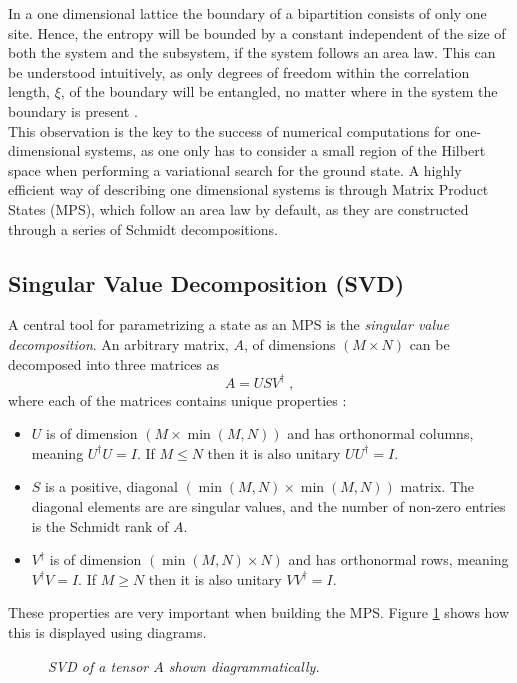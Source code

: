 In a one dimensional lattice the boundary of a bipartition consists of only one site. Hence, the entropy will be bounded by a constant independent of the size of both the system and the subsystem, if the system follows an area law. This can be understood intuitively, as only degrees of freedom within the correlation length, $\xi$, of the boundary will be entangled, no matter where in the system the boundary is present \cite{Hastings2007}.\\
This observation is the key to the success of numerical computations for one-dimensional systems, as one only has to consider a small region of the Hilbert space when performing a variational search for the ground state. A highly efficient way of describing one dimensional systems is through Matrix Product States (MPS), which follow an area law by default, as they are constructed through a series of Schmidt decompositions.


\subsection{Singular Value Decomposition (SVD)}
A central tool for parametrizing a state as an MPS is the \textit{singular value decomposition}. An arbitrary matrix, $A$, of dimensions $(M \times N)$ can be decomposed into three matrices as
\begin{equation}
	A = U S V^{\dag} \; ,
\end{equation}
where each of the matrices contains unique properties \cite{Schollwock}:
\begin{itemize}
	\item
		$U$ is of dimension $(M \times \min(M,N))$ and has orthonormal columns, meaning 			$U^{\dag}U = I$. If $M \leq N$ then it is also unitary $U U^{\dag} = I$.
	\item
		$S$ is a positive, diagonal $(\min(M,N) \times \min(M,N))$ matrix. The diagonal 			elements are are singular values, and the number of non-zero entries is the 				Schmidt rank of $A$.
	\item
		 $V^{\dag}$ is of dimension $(\min(M,N) \times N)$ and has orthonormal rows, meaning $V^{\dag}V = I$. If $M \geq N$ then it is also unitary $V V^{\dag} = I$.
\end{itemize}
These properties are very important when building the MPS. Figure \ref{fig:SVD} shows how this is displayed using diagrams.

\begin{figure}[h!]
	\centering
	
	\caption{\textit{SVD of a tensor $A$ shown diagrammatically.}}
	\label{fig:SVD}
\end{figure}


